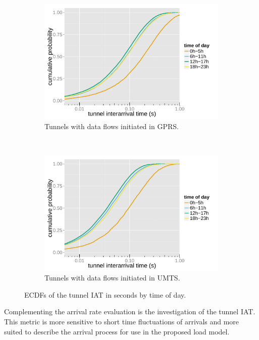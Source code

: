 \begin{figure}[htb]
	\begin{subfigure}[b]{0.5\textwidth}
		\includegraphics[width=\textwidth]{images/R-IAT-fromflows-gprs-ecdfs-2h.pdf}
		\caption{Tunnels with data flows initiated in \gls{GPRS}.}
		\label{c4:fig:IAT-ecdf-2h-active-gprs}
	\end{subfigure}%
	~
	\begin{subfigure}[b]{0.5\textwidth}
		\includegraphics[width=\textwidth]{images/R-IAT-fromflows-umts-ecdfs-2h.pdf}
		\caption{Tunnels with data flows initiated in \gls{UMTS}.}
		\label{c4:fig:IAT-ecdf-2h-active-umts}
	\end{subfigure}
	\caption{\glspl{ECDF} of the tunnel \gls{IAT} in seconds by time of day.}
\label{c4:fig:IAT-ecdf-2h}
\end{figure}

Complementing the arrival rate evaluation is the investigation of the tunnel \gls{IAT}. This metric is more sensitive to short time fluctuations of arrivals and more suited to describe the arrival process for use in the proposed load model.

